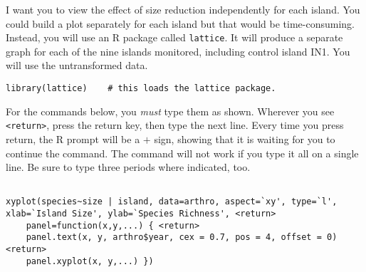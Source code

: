 \documentclass[11pt, oneside]{article}   	%
\begin{document}
I want you to view the effect of size reduction independently for each island.  You could build a plot separately for each island but that would be time-consuming.  Instead, you will use an R package called \texttt{lattice}.  It will produce a separate graph for each of the nine islands monitored, including control island IN1. You will use the untransformed data.


\begin{lstlisting}
library(lattice)	# this loads the lattice package.

\end{lstlisting}


For the commands below, you \emph{must} type them as shown. Wherever you see \texttt{<return>}, press the return key, then type the next line. Every time you press return, the R prompt will be a $+$ sign, showing that it is waiting for you to continue the command.  The command will not work if you type it all on a single line. Be sure to type three periods where indicated, too.

\begin{lstlisting}

xyplot(species~size | island, data=arthro, aspect=`xy', type=`l', xlab=`Island Size', ylab=`Species Richness', <return>
	panel=function(x,y,...) { <return>
	panel.text(x, y, arthro$year, cex = 0.7, pos = 4, offset = 0) <return>
	panel.xyplot(x, y,...) })

\end{lstlisting}
\end{document}

